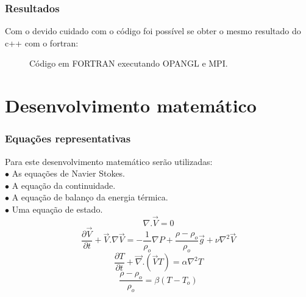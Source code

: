 \documentclass[xcolor=dvipsnames,10pt,aspectratio=169]{beamer}
\begin{document}
	\begin{frame}
		\frametitle{Resultados}
		
		\begin{minipage}[h!]{0.45\textwidth}
	 		Com o devido cuidado com o código foi possível se obter o mesmo resultado do c++ com o fortran:
	 	\end{minipage}\hfill
 		\begin{minipage}[h!]{0.5\textwidth}
	 		\begin{figure}
	 			\label{gif_gfort}
	 			\caption{Código em FORTRAN executando OPANGL e MPI.}
	 		\end{figure}
	 	\end{minipage}
	\end{frame}




\section{Desenvolvimento matemático}

	\begin{frame}
		\frametitle{Equações representativas}
		\flushleft
		Para este desenvolvimento matemático serão utilizadas:\\
		\quad $\bullet$ As equações de Navier Stokes.\\
		\quad $\bullet$ A equação da continuidade.\\
		\quad $\bullet$ A equação de balanço da energia térmica.\\
		\quad $\bullet$ Uma equação de estado.\\
		
		\begin{equation}
		\nabla . \vec{V} = 0
		\end{equation}
		\begin{equation}
		\frac{\partial \vec{V}}{\partial t} +  \vec{V} . {\nabla} \vec{V}  =  -\frac{1}{\rho_o} {\nabla}P + \frac{\rho - \rho_o}{\rho_o} \vec{g} + \nu \nabla ^2 \vec{V}
		\end{equation}
		\begin{equation}
		\frac{\partial T}{\partial t} + \vec{\nabla} . \left( \vec{V}T \right) = \alpha \nabla^2T
		\end{equation}
		\begin{equation}
		\frac{\rho - \rho_o}{\rho_o} = \beta \left( T - T_o\right)
		\end{equation}
	
	\end{frame}
\end{document}
